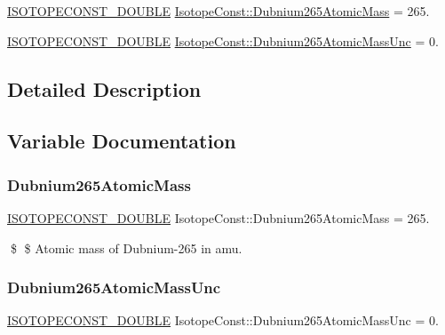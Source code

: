 \begin{DoxyCompactItemize}
\item 
\mbox{\hyperlink{group___isotope_const-_macros_ga8f45a7272ce02c0b4c65c44636ed719a}{I\+S\+O\+T\+O\+P\+E\+C\+O\+N\+S\+T\+\_\+\+D\+O\+U\+B\+LE}} \mbox{\hyperlink{group___isotope_const-_dubnium-_db265_ga4590815c48a8124886eb566e174b181e}{Isotope\+Const\+::\+Dubnium265\+Atomic\+Mass}} = 265.
\item 
\mbox{\hyperlink{group___isotope_const-_macros_ga8f45a7272ce02c0b4c65c44636ed719a}{I\+S\+O\+T\+O\+P\+E\+C\+O\+N\+S\+T\+\_\+\+D\+O\+U\+B\+LE}} \mbox{\hyperlink{group___isotope_const-_dubnium-_db265_ga62eadac58ebc2567e16fe4938e641be2}{Isotope\+Const\+::\+Dubnium265\+Atomic\+Mass\+Unc}} = 0.
\end{DoxyCompactItemize}


\subsection{Detailed Description}


\subsection{Variable Documentation}
\mbox{\label{group___isotope_const-_dubnium-_db265_ga4590815c48a8124886eb566e174b181e}} 
\subsubsection{\texorpdfstring{Dubnium265\+Atomic\+Mass}{Dubnium265AtomicMass}}
{\footnotesize\ttfamily \mbox{\hyperlink{group___isotope_const-_macros_ga8f45a7272ce02c0b4c65c44636ed719a}{I\+S\+O\+T\+O\+P\+E\+C\+O\+N\+S\+T\+\_\+\+D\+O\+U\+B\+LE}} Isotope\+Const\+::\+Dubnium265\+Atomic\+Mass = 265.}

\$ \$ Atomic mass of Dubnium-\/265 in amu. \mbox{\label{group___isotope_const-_dubnium-_db265_ga62eadac58ebc2567e16fe4938e641be2}} 
\subsubsection{\texorpdfstring{Dubnium265\+Atomic\+Mass\+Unc}{Dubnium265AtomicMassUnc}}
{\footnotesize\ttfamily \mbox{\hyperlink{group___isotope_const-_macros_ga8f45a7272ce02c0b4c65c44636ed719a}{I\+S\+O\+T\+O\+P\+E\+C\+O\+N\+S\+T\+\_\+\+D\+O\+U\+B\+LE}} Isotope\+Const\+::\+Dubnium265\+Atomic\+Mass\+Unc = 0.}

